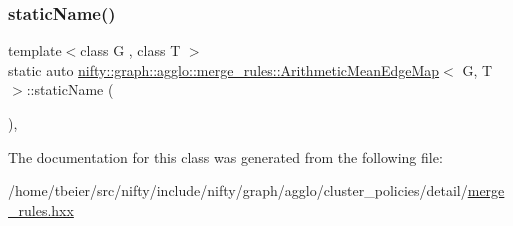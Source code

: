 \mbox{\label{classnifty_1_1graph_1_1agglo_1_1merge__rules_1_1ArithmeticMeanEdgeMap_a566abab9594baa39a5e445c368ed24e7}} 
\subsubsection{\texorpdfstring{static\+Name()}{staticName()}}
{\footnotesize\ttfamily template$<$class G , class T $>$ \\
static auto \hyperlink{classnifty_1_1graph_1_1agglo_1_1merge__rules_1_1ArithmeticMeanEdgeMap}{nifty\+::graph\+::agglo\+::merge\+\_\+rules\+::\+Arithmetic\+Mean\+Edge\+Map}$<$ G, T $>$\+::static\+Name (\begin{DoxyParamCaption}{ }\end{DoxyParamCaption})\hspace{0.3cm}{\ttfamily [inline]}, {\ttfamily [static]}}



The documentation for this class was generated from the following file\+:\begin{DoxyCompactItemize}
\item 
/home/tbeier/src/nifty/include/nifty/graph/agglo/cluster\+\_\+policies/detail/\hyperlink{merge__rules_8hxx}{merge\+\_\+rules.\+hxx}\end{DoxyCompactItemize}
